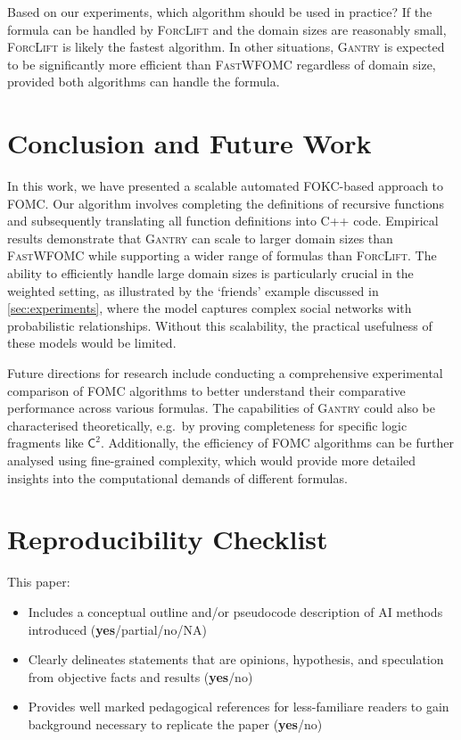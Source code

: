 \documentclass[letterpaper]{article} %
\theoremstyle{remark}
\theoremstyle{definition}
\newcommand{\Ctwo}{$\mathsf{C}^{2}$}
\newcommand{\Cranetwo}{\textsc{Gantry}}
\begin{document}

Based on our experiments, which algorithm should be used in practice? If the
formula can be handled by \textsc{ForcLift} and the domain sizes are reasonably
small, \textsc{ForcLift} is likely the fastest algorithm. In other situations,
\Cranetwo{} is expected to be significantly more efficient than
\textsc{FastWFOMC} regardless of domain size, provided both algorithms can
handle the formula.

\section{Conclusion and Future Work}\label{sec:conclusion}

In this work, we have presented a scalable automated FOKC-based approach to
FOMC. Our algorithm involves completing the definitions of recursive functions
and subsequently translating all function definitions into C++ code. Empirical
results demonstrate that \Cranetwo{} can scale to larger domain sizes than
\textsc{FastWFOMC} while supporting a wider range of formulas than
\textsc{ForcLift}. The ability to efficiently handle large domain sizes is
particularly crucial in the weighted setting, as illustrated by the `friends'
example discussed in \cref{sec:experiments}, where the model captures complex
social networks with probabilistic relationships. Without this scalability, the
practical usefulness of these models would be limited.

Future directions for research include conducting a comprehensive experimental
comparison of FOMC algorithms to better understand their comparative performance
across various formulas. The capabilities of \Cranetwo{} could also be
characterised theoretically, e.g.\ by proving completeness for specific logic
fragments like \Ctwo{}. Additionally, the efficiency of FOMC algorithms can be
further analysed using fine-grained complexity, which would provide more
detailed insights into the computational demands of different formulas.



\section{Reproducibility Checklist}

This paper:
\begin{itemize}
  \item Includes a conceptual outline and/or pseudocode description of AI
        methods introduced (\textbf{yes}/partial/no/NA)
  \item Clearly delineates statements that are opinions, hypothesis, and
        speculation from objective facts and results (\textbf{yes}/no)
  \item Provides well marked pedagogical references for less-familiare readers
        to gain background necessary to replicate the paper (\textbf{yes}/no)
\end{itemize}
\end{document}
